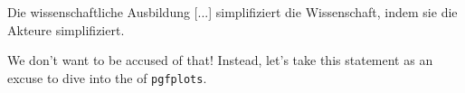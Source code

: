 \epigraph{Die wissenschaftliche Ausbildung [...] simplifiziert die \frqq Wissenschaft\flqq, indem sie die Akteure simplifiziert.}{}

We don’t want to be accused of that! Instead, let’s take this statement as an excuse to dive into the  of \verb|pgfplots|.